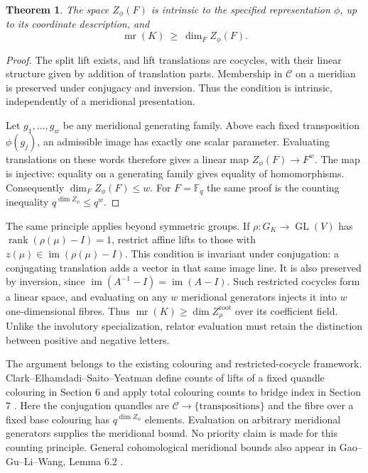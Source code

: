 \documentclass[11pt]{article}
\newtheorem{theorem}{Theorem}
\newcommand{\F}{\mathbb F}
\newcommand{\mr}{\operatorname{mr}}
\begin{document}
\begin{theorem}\label{thm:field}
The space $Z_\phi(F)$ is intrinsic to the specified representation
$\phi$, up to its coordinate description, and
\[
             \mr(K)\ \ge\ \dim_F Z_\phi(F).
\]
\end{theorem}
\begin{proof}
The split lift exists, and lift translations are cocycles, with their
linear structure given by addition of translation parts. Membership in
$\mathcal C$ on a meridian is preserved under conjugacy and inversion.
Thus the condition is intrinsic, independently of a meridional
presentation.

Let $g_1,\ldots,g_w$ be any meridional generating family. Above each
fixed transposition $\phi(g_j)$, an admissible image has exactly one
scalar parameter. Evaluating translations on these words therefore
gives a linear map $Z_\phi(F)\to F^w$. The map is injective: equality
on a generating family gives equality of homomorphisms. Consequently
$\dim_F Z_\phi(F)\le w$. For $F=\F_q$ the same proof is the counting
inequality $q^{\dim Z_\phi}\le q^w$.
\end{proof}

The same principle applies beyond symmetric groups. If
$\rho:G_K\to\operatorname{GL}(V)$ has
$\operatorname{rank}(\rho(\mu)-I)=1$, restrict affine lifts to those with
$z(\mu)\in\operatorname{im}(\rho(\mu)-I)$. This condition is invariant
under conjugation: a conjugating translation adds a vector in that same
image line. It is also preserved by inversion, since
$\operatorname{im}(A^{-1}-I)=\operatorname{im}(A-I)$. Such restricted
cocycles form a linear space, and evaluating on any $w$ meridional
generators injects it into $w$ one-dimensional fibres. Thus
$\mr(K)\ge\dim Z_{\rho}^{\mathrm{root}}$ over its coefficient field.
Unlike the involutory specialization, relator evaluation must retain
the distinction between positive and negative letters.

The argument belongs to the existing colouring and restricted-cocycle
framework. Clark--Elhamdadi--Saito--Yeatman define counts of lifts of a
fixed quandle colouring in Section 6 and apply total colouring counts to
bridge index in Section 7 \cite{cesy}. Here the conjugation quandles are
$\mathcal C\to\{\text{transpositions}\}$ and the fibre over a fixed base
colouring has $q^{\dim Z_\phi}$ elements. Evaluation on arbitrary
meridional generators supplies the meridional bound. No priority claim
is made for this counting principle. General cohomological meridional
bounds also appear in Gao--Gu--Li--Wang, Lemma 6.2 \cite{gglw}.
\end{document}
